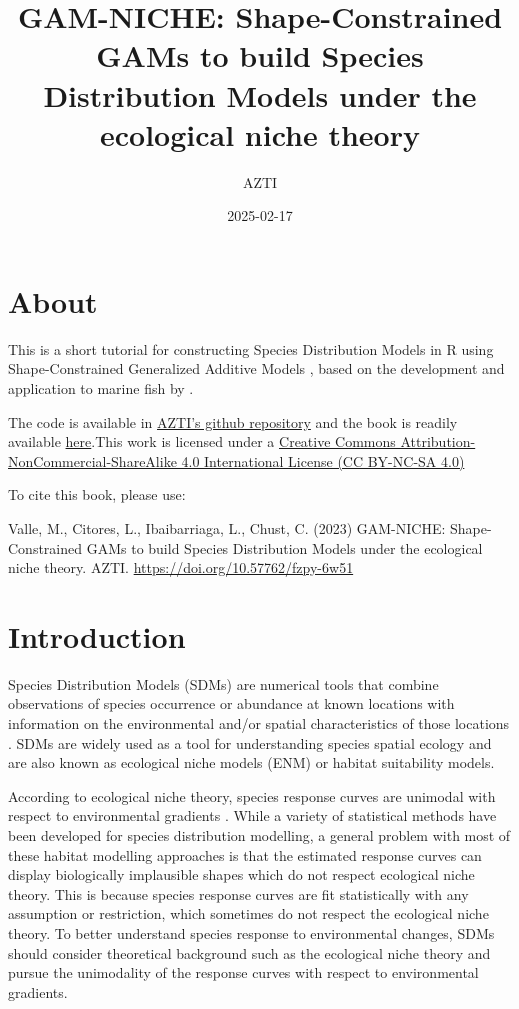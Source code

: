 \documentclass[
]{book}
\title{GAM-NICHE: Shape-Constrained GAMs to build Species Distribution Models under the ecological niche theory}
\author{AZTI}
\date{2025-02-17}
\begin{document}
\maketitle

{
\setcounter{tocdepth}{1}
\tableofcontents
}
\chapter*{About}\label{about}

This is a short tutorial for constructing Species Distribution Models in R using Shape-Constrained Generalized Additive Models \citep{pya_etal_2015}, based on the development and application to marine fish by \citet{citores_etal_2020}.

The code is available in \href{https://github.com/Fundacion-AZTI/gam-niche}{AZTI's github repository} and the book is readily available \href{https://fundacion-azti.github.io/gam-niche/}{here}.This work is licensed under a \href{https://creativecommons.org/licenses/by-nc-sa/4.0/}{Creative Commons Attribution-NonCommercial-ShareAlike 4.0 International License (CC BY-NC-SA 4.0)}

To cite this book, please use:

Valle, M., Citores, L., Ibaibarriaga, L., Chust, C. (2023) GAM-NICHE: Shape-Constrained GAMs to build Species Distribution Models under the ecological niche theory. AZTI. \url{https://doi.org/10.57762/fzpy-6w51}

\chapter{Introduction}\label{introduction}

Species Distribution Models (SDMs) are numerical tools that combine observations of species occurrence or abundance at known locations with information on the environmental and/or spatial characteristics of those locations \citep{elith_etal_2009}. SDMs are widely used as a tool for understanding species spatial ecology and are also known as ecological niche models (ENM) or habitat suitability models.

According to ecological niche theory, species response curves are unimodal with respect to environmental gradients \citep{hutchinson_1957}. While a variety of statistical methods have been developed for species distribution modelling, a general problem with most of these habitat modelling approaches is that the estimated response curves can display biologically implausible shapes which do not respect ecological niche theory. This is because species response curves are fit statistically with any assumption or restriction, which sometimes do not respect the ecological niche theory. To better understand species response to environmental changes, SDMs should consider theoretical background such as the ecological niche theory and pursue the unimodality of the response curves with respect to environmental gradients.
\end{document}
